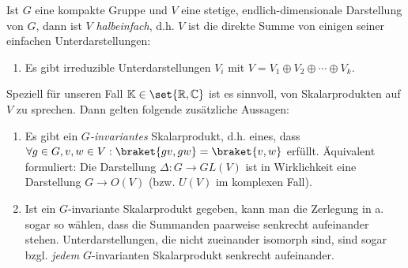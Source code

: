 \begin{theorem}
Ist $G$ eine kompakte Gruppe und $V$ eine stetige, endlich-dimensionale Darstellung von $G$, dann ist $V$ \emph{halbeinfach}, d.h. $V$ ist die direkte Summe von einigen seiner einfachen Unterdarstellungen:
\begin{enumerate}
\item Es gibt irreduzible Unterdarstellungen $V_i$ mit $V=V_1\oplus V_2\oplus\cdots\oplus V_k$.
\end{enumerate}

Speziell für unseren Fall $\IK\in\set{\IR,\IC}$ ist es sinnvoll, von Skalarprodukten auf $V$ zu sprechen. Dann gelten folgende zusätzliche Aussagen:
\begin{enumerate}[resume]
\item Es gibt ein \emph{$G$-invariantes} Skalarprodukt, d.h. eines, dass $\forall g\in G, v,w\in V: \braket{gv,gw} = \braket{v,w}$ erfüllt. Äquivalent formuliert: Die Darstellung $\Delta: G\to GL(V)$ ist in Wirklichkeit eine Darstellung $G\to O(V)$ (bzw. $U(V)$ im komplexen Fall).
\item Ist ein $G$-invariante Skalarprodukt gegeben, kann man die Zerlegung in a. sogar so wählen, dass die Summanden paarweise senkrecht aufeinander stehen. Unterdarstellungen, die nicht zueinander isomorph sind, sind sogar bzgl. \emph{jedem} $G$-invarianten Skalarprodukt senkrecht aufeinander.
\end{enumerate}
\end{theorem}
